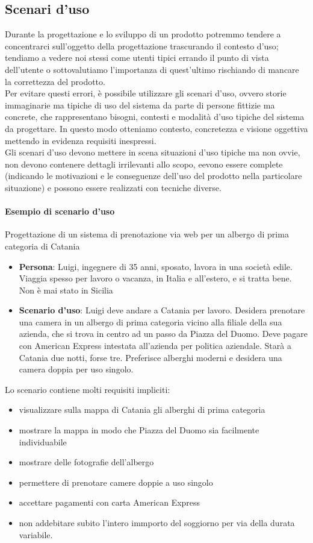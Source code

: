 \documentclass{report}
\begin{document}
	\subsection{Scenari d'uso}
	Durante la progettazione e lo sviluppo di un prodotto potremmo tendere a concentrarci sull'oggetto della progettazione trascurando il contesto d'uso; tendiamo a vedere noi stessi come utenti tipici errando il punto di vista dell'utente o sottovalutiamo l'importanza di quest'ultimo rischiando di mancare la correttezza del prodotto.
	\vspace{\baselineskip}\\
	Per evitare questi errori, è possibile utilizzare gli scenari d'uso, ovvero storie immaginarie ma tipiche di uso del sistema da parte di persone fittizie ma concrete, che rappresentano bisogni, contesti e modalità d'uso tipiche del sistema da progettare. In questo modo otteniamo contesto, concretezza e visione oggettiva mettendo in evidenza requisiti inespressi.
	\vspace{\baselineskip}\\
	Gli scenari d'uso devono mettere in scena situazioni d'uso tipiche ma non ovvie, non devono contenere dettagli irrilevanti allo scopo, eevono essere complete (indicando le motivazioni e le conseguenze dell'uso del prodotto nella particolare situazione) e possono essere realizzati con tecniche diverse.
	\paragraph{Esempio di scenario d'uso}
	Progettazione di un sistema di prenotazione via web per un albergo di prima categoria di Catania
	\begin{itemize}
		\item \textbf{Persona}: Luigi, ingegnere di 35 anni, sposato, lavora in una società edile. Viaggia spesso per lavoro o vacanza, in Italia e all'estero, e si tratta bene. Non è mai stato in Sicilia
		\item \textbf{Scenario d'uso}: Luigi deve andare a Catania per lavoro. Desidera prenotare una camera in un albergo di prima categoria vicino alla filiale della sua azienda, che si trova in centro ad un passo da Piazza del Duomo. Deve pagare con American Express intestata all'azienda per politica aziendale. Starà a Catania due notti, forse tre. Preferisce alberghi moderni e desidera una camera doppia per uso singolo.
	\end{itemize}
	Lo scenario contiene molti requisiti impliciti:
	\begin{itemize}
		\item visualizzare sulla mappa di Catania gli alberghi di prima categoria
		\item mostrare la mappa in modo che Piazza del Duomo sia facilmente individuabile
		\item mostrare delle fotografie dell'albergo
		\item permettere di prenotare camere doppie a uso singolo
		\item accettare pagamenti con carta American Express
		\item non addebitare subito l'intero immporto del soggiorno per via della durata variabile.
	\end{itemize}
\end{document}
